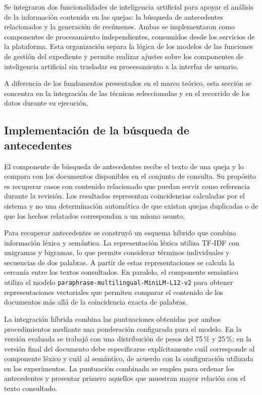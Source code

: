 Se integraron dos funcionalidades de inteligencia artificial para apoyar el análisis de la información contenida en las quejas: la búsqueda de antecedentes relacionados y la generación de resúmenes. Ambas se implementaron como componentes de procesamiento independientes, consumidos desde los servicios de la plataforma. Esta organización separa la lógica de los modelos de las funciones de gestión del expediente y permite realizar ajustes sobre los componentes de inteligencia artificial sin trasladar su procesamiento a la interfaz de usuario.

A diferencia de los fundamentos presentados en el marco teórico, esta sección se concentra en la integración de las técnicas seleccionadas y en el recorrido de los datos durante su ejecución.

\subsection{Implementación de la búsqueda de antecedentes}
\label{subsec:implementacion_antecedentes}

El componente de búsqueda de antecedentes recibe el texto de una queja y lo compara con los documentos disponibles en el conjunto de consulta. Su propósito es recuperar casos con contenido relacionado que puedan servir como referencia durante la revisión. Los resultados representan coincidencias calculadas por el sistema y no una determinación automática de que existan quejas duplicadas o de que los hechos relatados correspondan a un mismo asunto.

Para recuperar antecedentes se construyó un esquema híbrido que combina información léxica y semántica. La representación léxica utiliza TF-IDF con unigramas y bigramas, lo que permite considerar términos individuales y secuencias de dos palabras. A partir de estas representaciones se calcula la cercanía entre los textos consultados. En paralelo, el componente semántico utiliza el modelo \texttt{paraphrase-multilingual-MiniLM-L12-v2} para obtener representaciones vectoriales que permiten comparar el contenido de los documentos más allá de la coincidencia exacta de palabras.

La integración híbrida combina las puntuaciones obtenidas por ambos procedimientos mediante una ponderación configurada para el modelo. En la versión evaluada se trabajó con una distribución de pesos del 75\,\% y 25\,\%; en la versión final del documento debe especificarse explícitamente cuál corresponde al componente léxico y cuál al semántico, de acuerdo con la configuración utilizada en los experimentos. La puntuación combinada se emplea para ordenar los antecedentes y presentar primero aquellos que muestran mayor relación con el texto consultado.

